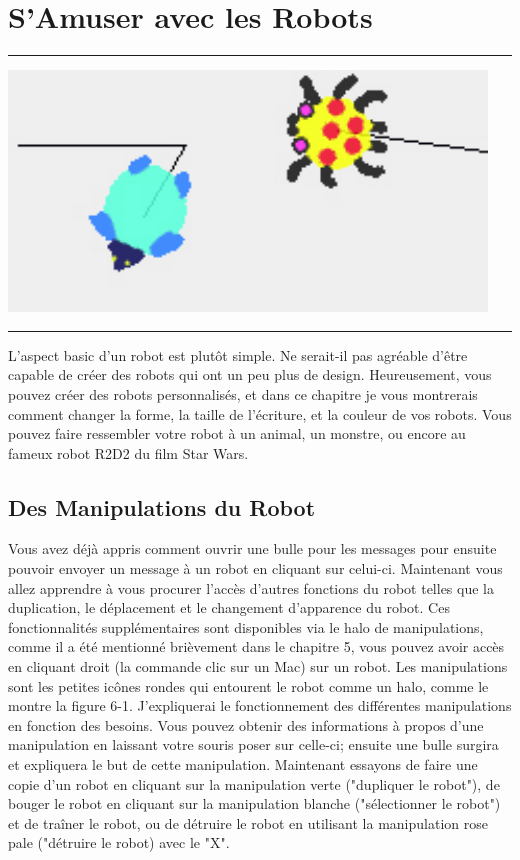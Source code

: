 \documentclass[a4paper,10pt,twoside]{book}
\begin{document}
    \sloppy
\fi

\chapter{S'Amuser avec les Robots }\label{cha:fun}


\noindent\hrule
\begin{center}\includegraphics{beasts}\end{center}
\vspace{0.2cm}
\noindent\hrule\vspace{1.5cm}


L'aspect basic d'un robot est plut\^ot simple. Ne serait-il pas agr\'eable d'\^etre capable de cr\'eer 
des robots qui ont un peu plus de design. Heureusement, vous pouvez cr\'eer des robots personnalis\'es, 
et dans ce chapitre je vous montrerais comment changer la forme, la taille de l'\'ecriture, et la 
couleur de vos robots. Vous pouvez faire ressembler votre robot \`a un animal, un monstre, ou 
encore au fameux robot R2D2 du film Star Wars.


\section{Des Manipulations du Robot}

Vous avez d\'ej\`a appris comment ouvrir une bulle pour les messages pour ensuite pouvoir  
envoyer un message \`a un robot en cliquant sur celui-ci. Maintenant vous allez apprendre 
\`a vous procurer l'acc\`es d'autres fonctions du robot telles que la duplication, le d\'eplacement 
et le changement d'apparence du robot. Ces fonctionnalit\'es suppl\'ementaires sont disponibles via 
le halo de manipulations, comme il a \'et\'e mentionn\'e bri\`evement dans le chapitre 5, vous pouvez 
avoir acc\`es en cliquant droit (la commande clic sur un Mac) sur un robot. Les manipulations 
sont les petites icônes rondes qui entourent le robot comme un halo, comme le montre la 
figure 6-1. J'expliquerai le fonctionnement des diff\'erentes manipulations en fonction des 
besoins. Vous pouvez obtenir des informations \`a propos d'une manipulation en laissant votre 
souris poser sur celle-ci; ensuite une bulle surgira et expliquera le but de cette manipulation. 
Maintenant essayons de faire une copie d'un robot en cliquant sur la manipulation verte 
("dupliquer le robot"), de bouger le robot en cliquant sur la manipulation blanche 
("s\'electionner le robot") et de traîner le robot, ou de d\'etruire le robot en utilisant la 
manipulation rose pale ("d\'etruire le robot) avec le "X".
\end{document}
